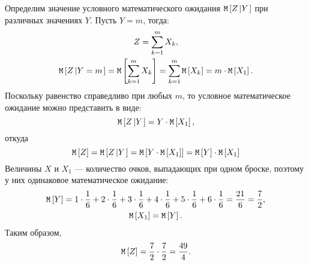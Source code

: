 Определим значение условного математического ожидания $\mathtt{M} \left [ Z \left | Y \right . \right ]$ при различных значениях $Y$. Пусть $Y = m$, тогда:
\begin{gather}
    Z = \sum_{k=1}^m X_k, \\
    \mathtt{M} \left [ Z \left | Y=m \right . \right ]
    = \mathtt{M} \left [ \sum_{k=1}^m X_k \right ]
    = \sum_{k=1}^m \mathtt{M} \left [ X_k \right ]
    = m \cdot \mathtt{M} \left [ X_1 \right ] .
\end{gather}
Поскольку равенство справедливо при любых $m$, то условное математическое ожидание можно представить в виде:
\begin{equation}
    \label{10:463:conditional_expectation}
    \mathtt{M} \left [ Z \left | Y \right . \right ] = Y \cdot \mathtt{M} \left [ X_1 \right ] ,
\end{equation}
откуда
\begin{equation}
    \mathtt{M} \left [ Z \right ]
    = \mathtt{M} \left [ Z \left | Y \right . \right ]
    = \mathtt{M} \left [ Y \cdot \mathtt{M} \left [ X_1 \right ] \right ]
    = \mathtt{M} \left [ Y \right ] \cdot \mathtt{M} \left [ X_1 \right ]
\end{equation}
Величины $X$ и $X_1$ --- количество очков, выпадающих при одном броске, поэтому у них одинаковое математическое ожидание:
\begin{gather}
    \mathtt{M} \left [ Y \right ]
    = 1 \cdot \frac{1}{6} + 2 \cdot \frac{1}{6} + 3 \cdot \frac{1}{6} + 4 \cdot \frac{1}{6} + 5 \cdot \frac{1}{6} + 6 \cdot \frac{1}{6}
    = \frac{21}{6}
    = \frac{7}{2}, \\
    \mathtt{M} \left [ X_1 \right ] = \mathtt{M} \left [ Y \right ].
\end{gather}
Таким образом,
\begin{equation}
    \mathtt{M} \left [ Z \right ]
    = \frac{7}{2} \cdot \frac{7}{2}
    = \frac{49}{4} .
\end{equation}

